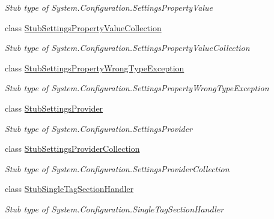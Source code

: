 \begin{DoxyCompactItemize}
\begin{DoxyCompactList}\small\item\em Stub type of System.\-Configuration.\-Settings\-Property\-Value\end{DoxyCompactList}\item 
class \hyperlink{class_system_1_1_configuration_1_1_fakes_1_1_stub_settings_property_value_collection}{Stub\-Settings\-Property\-Value\-Collection}
\begin{DoxyCompactList}\small\item\em Stub type of System.\-Configuration.\-Settings\-Property\-Value\-Collection\end{DoxyCompactList}\item 
class \hyperlink{class_system_1_1_configuration_1_1_fakes_1_1_stub_settings_property_wrong_type_exception}{Stub\-Settings\-Property\-Wrong\-Type\-Exception}
\begin{DoxyCompactList}\small\item\em Stub type of System.\-Configuration.\-Settings\-Property\-Wrong\-Type\-Exception\end{DoxyCompactList}\item 
class \hyperlink{class_system_1_1_configuration_1_1_fakes_1_1_stub_settings_provider}{Stub\-Settings\-Provider}
\begin{DoxyCompactList}\small\item\em Stub type of System.\-Configuration.\-Settings\-Provider\end{DoxyCompactList}\item 
class \hyperlink{class_system_1_1_configuration_1_1_fakes_1_1_stub_settings_provider_collection}{Stub\-Settings\-Provider\-Collection}
\begin{DoxyCompactList}\small\item\em Stub type of System.\-Configuration.\-Settings\-Provider\-Collection\end{DoxyCompactList}\item 
class \hyperlink{class_system_1_1_configuration_1_1_fakes_1_1_stub_single_tag_section_handler}{Stub\-Single\-Tag\-Section\-Handler}
\begin{DoxyCompactList}\small\item\em Stub type of System.\-Configuration.\-Single\-Tag\-Section\-Handler\end{DoxyCompactList}\end{DoxyCompactItemize}
